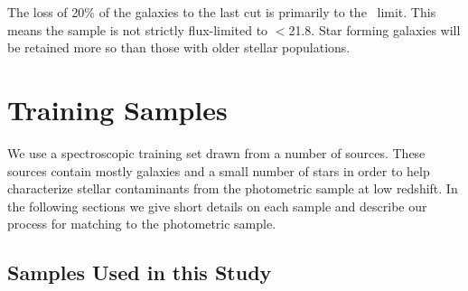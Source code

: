 \documentclass[12pt,preprint]{aastex}
\newcommand{\rmax}{21.8}
\begin{document}
The loss of 20\% of the galaxies to the last cut is primarily to the \umag\
limit.  This means the sample is not strictly flux-limited to \rmag$ < $\rmax.
Star forming galaxies will be retained more so than those with older stellar
populations.

\section{Training Samples} \label{sec:train}

We use a spectroscopic training set drawn from a number of sources. These
sources contain mostly galaxies and a small number of stars in order to help
characterize stellar contaminants from the photometric sample at low redshift.
In the following sections we give short details on each sample and describe our
process for matching to the photometric sample.

\subsection{Samples Used in this Study} \label{sec:train:def}
\end{document}
